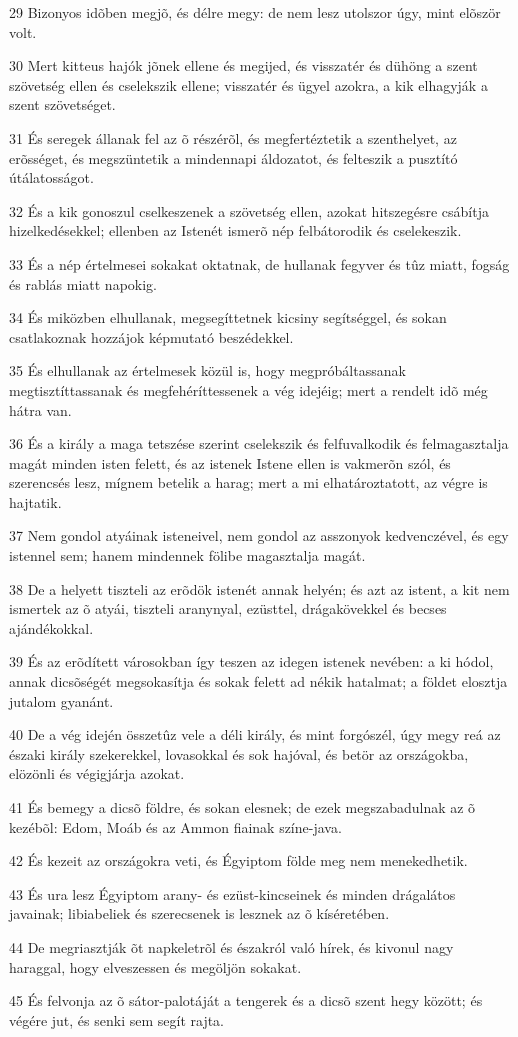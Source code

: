 \par 29 Bizonyos idõben megjõ, és délre megy: de nem lesz utolszor úgy, mint elõször volt.
\par 30 Mert kitteus hajók jõnek ellene és megijed, és visszatér és dühöng a szent szövetség ellen és cselekszik ellene; visszatér és ügyel azokra, a kik elhagyják a szent szövetséget.
\par 31 És seregek állanak fel az õ részérõl, és megfertéztetik a szenthelyet, az erõsséget, és megszüntetik a mindennapi áldozatot, és felteszik a pusztító útálatosságot.
\par 32 És a kik gonoszul cselkeszenek a szövetség ellen, azokat hitszegésre csábítja hizelkedésekkel; ellenben az Istenét ismerõ nép felbátorodik és cselekeszik.
\par 33 És a nép értelmesei sokakat oktatnak, de hullanak fegyver és tûz miatt, fogság és rablás miatt napokig.
\par 34 És miközben elhullanak, megsegíttetnek kicsiny segítséggel, és sokan csatlakoznak hozzájok képmutató beszédekkel.
\par 35 És elhullanak az értelmesek közül is, hogy megpróbáltassanak megtisztíttassanak és megfehéríttessenek a vég idejéig; mert a rendelt idõ még hátra van.
\par 36 És a király a maga tetszése szerint cselekszik és felfuvalkodik és felmagasztalja magát minden isten felett, és az istenek Istene ellen is vakmerõn szól, és szerencsés lesz, mígnem betelik a harag; mert a mi elhatároztatott, az végre is hajtatik.
\par 37 Nem gondol atyáinak isteneivel, nem gondol az asszonyok kedvenczével, és egy istennel sem; hanem mindennek fölibe magasztalja magát.
\par 38 De a helyett tiszteli az erõdök istenét annak helyén; és azt az istent, a kit nem ismertek az õ atyái, tiszteli aranynyal, ezüsttel, drágakövekkel és becses ajándékokkal.
\par 39 És az erõdített városokban így teszen az idegen istenek nevében: a ki hódol, annak dicsõségét megsokasítja és sokak felett ad nékik hatalmat; a földet elosztja jutalom gyanánt.
\par 40 De a vég idején összetûz vele a déli király, és mint forgószél, úgy megy reá az északi király szekerekkel, lovasokkal és sok hajóval, és betör az országokba, elözönli és végigjárja azokat.
\par 41 És bemegy a dicsõ földre, és sokan elesnek; de ezek megszabadulnak az õ kezébõl: Edom, Moáb és az Ammon fiainak színe-java.
\par 42 És kezeit az országokra veti, és Égyiptom földe meg nem menekedhetik.
\par 43 És ura lesz Égyiptom arany- és ezüst-kincseinek és minden drágalátos javainak; libiabeliek és szerecsenek is lesznek az õ kíséretében.
\par 44 De megriasztják õt napkeletrõl és északról való hírek, és kivonul nagy haraggal, hogy elveszessen és megöljön sokakat.
\par 45 És felvonja az õ sátor-palotáját a tengerek és a dicsõ szent hegy között; és végére jut, és senki sem segít rajta.

